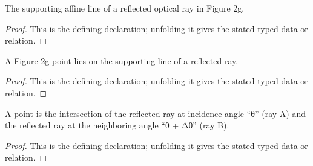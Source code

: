 \begin{definition}[ReflectedRayLine]
  \label{decl:physics:IPhO_2026_2_C_3:ReflectedRayLine}
  The supporting affine line of a reflected optical ray in Figure 2g.
\end{definition}
\begin{proof}
  This is the defining declaration; unfolding it gives the stated typed data or relation.
\end{proof}

\begin{definition}
  \label{decl:physics:IPhO_2026_2_C_3:ReflectedRayLine:Contains}
  A Figure 2g point lies on the supporting line of a reflected ray.
\end{definition}
\begin{proof}
  This is the defining declaration; unfolding it gives the stated typed data or relation.
\end{proof}

\begin{definition}[IsNeighboringReflectedIntersection]
  \label{decl:physics:IPhO_2026_2_C_3:IsNeighboringReflectedIntersection}
  A point is the intersection of the reflected ray at incidence angle “θ” (ray A) and the reflected ray at the neighboring angle “θ + Δθ” (ray B).
\end{definition}
\begin{proof}
  This is the defining declaration; unfolding it gives the stated typed data or relation.
\end{proof}

